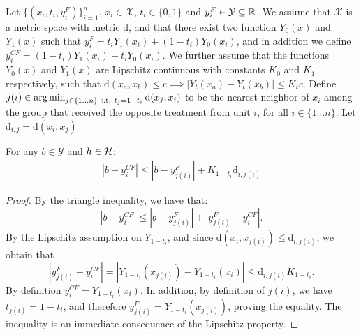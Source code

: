 \begin{lemma}\label{lemma1}
Let $\{(x_i,t_i,y_i^F)\}_{i=1}^n$,  $x_i \in \mathcal{X}$, $t_i \in \{0,1\}$ and $y_i^F \in \mathcal{Y} \subseteq \mathbb{R} $. We assume that $\mathcal{X}$ is a metric space with metric $\mathrm{d}$, and that there exist two function $Y_0(x)$ and $Y_1(x)$ such that $y_i^F = t_i Y_1(x_i) + (1-t_i)Y_0(x_i)$, and in addition we define $y_i^{CF} = (1-t_i) Y_1(x_i) + t_i Y_0(x_i)$. We further assume that the functions $Y_0(x)$  and $Y_1(x)$ are Lipschitz continuous with constants $K_0$ and $K_1$ respectively, such that $\mathrm{d}(x_a,x_b) \leq c \implies |Y_t(x_a) - Y_t(x_b)| \leq K_t c$. Define  $j(i) \in \operatorname*{arg\,min}_{j \in \{1\ldots n\} \text{ s.t. } t_j = 1-t_i} \mathrm{d}(x_j,x_i)$ to be the nearest neighbor of $x_i$ among the group that received the opposite treatment from unit $i$, for all $i \in \{1 \ldots n\}$. Let $\mathrm{d}_{i,j} = \mathrm{d}(x_i,x_j)$

For any $b \in \mathcal{Y}$ and $h \in \mathcal{H}$:
\begin{align*}
|b-y_i^{CF} | \leq | b - y_{j(i)}^F| + K_{1-t_i} \mathrm{d}_{i,j(i)}
\end{align*}
\end{lemma}
\begin{proof}
By the triangle inequality, we have that:
$$|b-y_i^{CF} | \leq | b - y_{j(i)}^F|  + |y_{j(i)}^F - y_i^{CF}|.$$
By the Lipschitz assumption on $Y_{1-t_i}$, and since $\mathrm{d}(x_i,x_{j(i)}) \leq \mathrm{d}_{i,j(i)}$, we obtain that $$ |y_{j(i)}^F - y_i^{CF}| = |Y_{1-t_i}(x_{j(i)}) - Y_{1-t_i}(x_i) | \leq \mathrm{d}_{i,j(i)} K_{1-t_i}.$$
By definition $y_i^{CF} = Y_{1-t_i}(x_i)$. In addition, by definition of $j(i)$, we have $t_{j(i)} = 1-t_i$, and therefore $y_{j(i)}^F = Y_{1-t_i}(x_{j(i)})$, proving the equality. The inequality is an immediate consequence of the Lipschitz property.
\end{proof}

